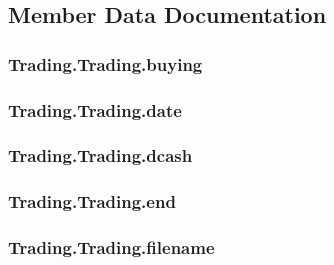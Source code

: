 \subsection{Member Data Documentation}
\hypertarget{class_trading_1_1_trading_ab876239e7f29c4462624ed3a74fce105}{
\subsubsection[{buying}]{\setlength{\rightskip}{0pt plus 5cm}Trading.\-Trading.\-buying}}\label{class_trading_1_1_trading_ab876239e7f29c4462624ed3a74fce105}
\hypertarget{class_trading_1_1_trading_a5924d9c6391ed224a0935c6cd0483cbf}{
\subsubsection[{date}]{\setlength{\rightskip}{0pt plus 5cm}Trading.\-Trading.\-date}}\label{class_trading_1_1_trading_a5924d9c6391ed224a0935c6cd0483cbf}
\hypertarget{class_trading_1_1_trading_aef7baa9b87a0f6d4dd33c37f99323f73}{
\subsubsection[{dcash}]{\setlength{\rightskip}{0pt plus 5cm}Trading.\-Trading.\-dcash}}\label{class_trading_1_1_trading_aef7baa9b87a0f6d4dd33c37f99323f73}
\hypertarget{class_trading_1_1_trading_aef2277d54f34e88fb02950beb5510bb2}{
\subsubsection[{end}]{\setlength{\rightskip}{0pt plus 5cm}Trading.\-Trading.\-end}}\label{class_trading_1_1_trading_aef2277d54f34e88fb02950beb5510bb2}
\hypertarget{class_trading_1_1_trading_a06913f18cdfc3247f36d0718783166ef}{
\subsubsection[{filename}]{\setlength{\rightskip}{0pt plus 5cm}Trading.\-Trading.\-filename}}\label{class_trading_1_1_trading_a06913f18cdfc3247f36d0718783166ef}
